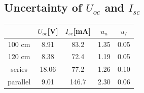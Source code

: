 \documentclass[12pt]{article}
\begin{document}
\subsection{Uncertainty of $U_{oc}$ and $I_{sc}$}
\begin{table}[H]
\centering
\begin{tabular}{|c|c|c|c|c|}
\hline
         & $U_{oc}$[V]&$I_{sc}$[mA] &$u_u$  &$u_I$  \\ \hline
100 cm    & 8.91  & 83.2  &1.35  &0.05  \\ \hline
120 cm    & 8.38  & 72.4  &1.19  &0.05  \\ \hline
series   & 18.06 & 77.2   &1.26  &0.10  \\ \hline
parallel & 9.01  & 146.7  &2.30  &0.06  \\ \hline
\end{tabular}
\end{table}
\end{document}
